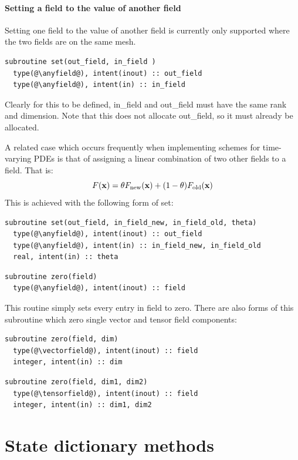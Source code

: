 \documentclass[a4paper, 11pt]{book}
\begin{document}
\subsubsection{Setting a field to the value of another field}

Setting one field to the value of another field is currently only supported
where the two fields are on the same mesh. 
\begin{lstlisting}
subroutine set(out_field, in_field )
  type(@\anyfield@), intent(inout) :: out_field
  type(@\anyfield@), intent(in) :: in_field
\end{lstlisting}
Clearly for this to be defined, in\_field and out\_field must have the same
rank and dimension. Note that this does not allocate out\_field, so it must
already be allocated.

A related case which occurs frequently when implementing schemes for
time-varying PDEs is that of assigning a linear combination of two other
fields to a field. That is:
\begin{equation}
  F(\mathbf{x})=\theta F_{\textrm{new}}(\mathbf{x}) + (1-\theta) F_{\textrm{old}}(\mathbf{x})
\end{equation}
This is achieved with the following form of set:
\begin{lstlisting}
subroutine set(out_field, in_field_new, in_field_old, theta)
  type(@\anyfield@), intent(inout) :: out_field
  type(@\anyfield@), intent(in) :: in_field_new, in_field_old
  real, intent(in) :: theta
\end{lstlisting}


\begin{lstlisting} 
subroutine zero(field)
  type(@\anyfield@), intent(inout) :: field
\end{lstlisting}

This routine simply sets every entry in field to zero. There are also forms
of this subroutine which zero single vector and tensor field components:

\begin{lstlisting}
subroutine zero(field, dim)
  type(@\vectorfield@), intent(inout) :: field
  integer, intent(in) :: dim
\end{lstlisting}
\begin{lstlisting}
subroutine zero(field, dim1, dim2)
  type(@\tensorfield@), intent(inout) :: field
  integer, intent(in) :: dim1, dim2
\end{lstlisting}


\chapter{State dictionary methods}
\end{document}
